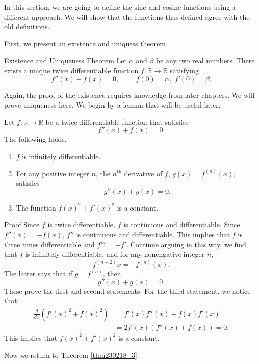 In this section, we are going to define the sine and cosine functions using a different approach. We will show that the functions thus defined agree with the old definitions.

First, we present an existence and uniquess theorem.
\begin{theorem}[label=thm230218_3]{Existence and Uniqueness Theorem}
Let $\alpha$ and $\beta$ be any two real numbers. There exists a unique twice  differentiable function $f:\mathbb{R}\to\mathbb{R}$ satisfying
\[f''(x)+f(x)=0,\hspace{1cm}f(0)=\alpha,\;f'(0)=\beta.\]
\end{theorem}
Again, the proof of the existence requires knowledge from later chapters. We will prove uniqueness here. We begin by a lemma that will be useful later.
\begin{lemma}[label=lemma230218_5]{}Let  
 $f:\mathbb{R}\to\mathbb{R}$ be a twice differentiable  function that satisfies
\[f''(x)+f(x)=0.\]The following holds.
\begin{enumerate}[1.]
\item
  $f$ is infinitely differentiable. 
\item For any positive integer $n$, the $n^{\text{th}}$ derivative of $f$, $g(x)=f^{(n)}(x)$,   satisfies 
\[g''(x)+g(x)=0.\]
\item The function 
$ f(x)^2+f'(x)^2$ is  a constant.\end{enumerate}
\end{lemma}
\begin{myproof}{Proof}
Since $f$ is twice differentiable, $f$ is  continuous and differentiable. Since
$f''(x)=-f(x)$,   $f''$ is   continuous and differentiable.  This implies that $f$ is three times differentiable and $f'''=-f'$. Continue arguing in this way, we find that $f$ is infinitely differentiable, and for any nonengative integer $n$, \[f^{(n+2)}{x}=-f^{(n)}(x).\] The latter says that if $g=f^{(n)}$, then
\[g''(x)+g(x)=0.\]
These prove the first and second statements. For the third statement, 
we notice that
\begin{align*}\frac{d}{dx}\left(f'(x)^2+f(x)^2\right)&=f'(x)f''(x)+f(x)f'(x)\\&=2f'(x)\left(f''(x)+f(x)\right)=0.\end{align*}
This implies that $f(x)^2+f'(x)^2$ is  a constant.
\end{myproof}
Now we return to Theorem  \ref{thm230218_3}.
